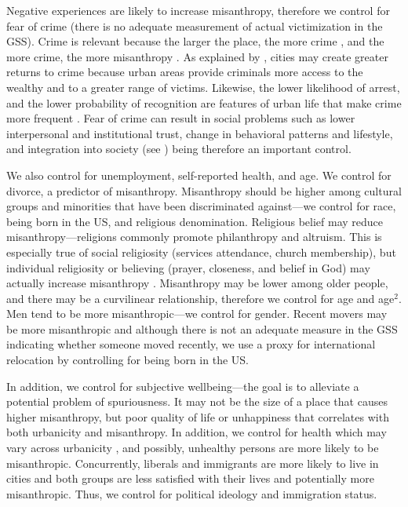 \documentclass[11pt, letterpaper]{article}
\begin{document}
\begin{spacing}{1.4}
Negative experiences are likely to increase misanthropy, therefore we control
for fear of crime (there is no adequate measurement of actual victimization in
the GSS). Crime is relevant because the larger the place, the more crime
\citep{bettencourt10b,wirth38,white77}, and the more crime, the more misanthropy
\citep{wilson85}. As explained by \citet{glaeser1999}, cities may create greater
returns to crime because urban areas provide criminals more access to the wealthy and to
a greater range of victims. Likewise, the lower likelihood of
arrest, and the lower probability of recognition are features of urban life that
make crime more frequent  \citep{glaeser1999}. %
 Fear of crime can result in social problems such as lower interpersonal and institutional trust, change in behavioral patterns and lifestyle, and integration into society (see \citet{krulichova2018life}) being therefore an important control. 

We also control for unemployment, self-reported health, and age. We control for
divorce, a predictor of misanthropy.  Misanthropy should be higher among
cultural groups and minorities that have been discriminated against---we control
for race, being born in the US, and religious denomination. Religious belief may
reduce misanthropy---religions commonly promote philanthropy and altruism. This
is especially true of social religiosity (services attendance, church
membership), but individual religiosity or believing (prayer, closeness, and
belief in God) may actually increase misanthropy \citep{aok20rel}. Misanthropy
may be lower among older people, and there may be a curvilinear relationship,
therefore we control for age and age$^2$. Men tend to be more misanthropic---we
control for gender. Recent movers may be more misanthropic and although there is not an adequate measure in the GSS indicating whether someone moved recently, we use a proxy for international relocation by controlling for being born in the US.

In addition, we control for subjective wellbeing---the goal is to alleviate a potential problem of spuriousness. It may not be the size of a place that causes higher misanthropy, but %
poor quality of life or unhappiness \citep{aok21} that correlates with
both urbanicity and misanthropy.  %
 In addition, we control for health which may vary across urbanicity
 \citep[e.g.,][]{chen2019differences}, and possibly, unhealthy persons are more likely to be misanthropic.  
 Concurrently, liberals and immigrants are more likely to live in cities and both groups are less satisfied with their lives \citep{aok11a,aokJap14} and potentially more misanthropic. Thus, we control for political ideology and immigration status.


\end{spacing}
\end{document}
